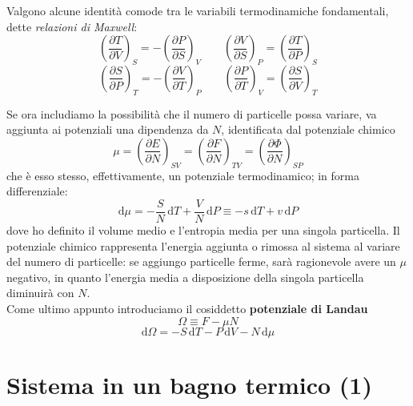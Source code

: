 \documentclass[a4paper]{report}
\begin{document}
Valgono alcune identità comode tra le variabili termodinamiche fondamentali, dette  \textit{relazioni di Maxwell}:
\begin{equation}
    \left(\frac{\partial T}{\partial V}\right)_S = -\left(\frac{\partial P}{\partial S}\right)_V \qquad \left(\frac{\partial V}{\partial S}\right)_P = \left(\frac{\partial T}{\partial P}\right)_S 
\end{equation}
\begin{equation}
    \left(\frac{\partial S}{\partial P}\right)_T = -\left(\frac{\partial V}{\partial T}\right)_P \qquad \left(\frac{\partial P}{\partial T}\right)_V = \left(\frac{\partial S}{\partial V}\right)_T
\end{equation}

Se ora includiamo la possibilità che il numero di particelle possa variare, va aggiunta ai potenziali una dipendenza da $N$, identificata dal potenziale chimico
\begin{equation}
    \mu = \left(\frac{\partial E}{\partial N}\right)_{SV} = \left(\frac{\partial F}{\partial N}\right)_{TV} = \left(\frac{\partial \Phi}{\partial N}\right)_{SP}
\end{equation}
che è esso stesso, effettivamente, un potenziale termodinamico; in forma differenziale:
\begin{equation}
    \mathrm{d}\mu = - \frac{S}{N} \, \mathrm{d}T + \frac{V}{N} \, \mathrm{d}P \equiv - s \,\mathrm{d}T + v \, \mathrm{d}P
\end{equation}
dove ho definito il volume medio e l'entropia media per una singola particella. Il potenziale chimico rappresenta l'energia aggiunta o rimossa al sistema al variare del numero di particelle: se aggiungo particelle ferme, sarà ragionevole avere un $\mu$ negativo, in quanto l'energia media a disposizione della singola particella diminuirà con $N$.\\
Come ultimo appunto introduciamo il cosiddetto \textbf{potenziale di Landau}
\begin{equation}
    \Omega \equiv F - \mu N
\end{equation}
\begin{equation}
    \mathrm{d}\Omega = -S\,\mathrm{d}T - P\,\mathrm{d}V -N\,\mathrm{d}\mu
\end{equation}

\section{Sistema in un bagno termico (1)}
\end{document}

